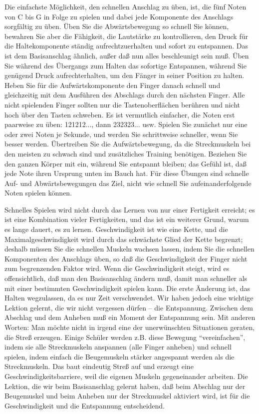 Die einfachste Möglichkeit, den schnellen Anschlag zu üben, ist, die fünf Noten von C bis G in Folge zu spielen und dabei jede Komponente des Anschlags sorgfältig zu üben.
Üben Sie die Abwärtsbewegung so schnell Sie können, bewahren Sie aber die Fähigkeit, die Lautstärke zu kontrollieren, den Druck für die Haltekomponente ständig aufrechtzuerhalten und sofort zu entspannen.
Das ist dem Basisanschlag ähnlich, außer daß nun alles beschleunigt sein muß.
Üben Sie während des Übergangs zum Halten das sofortige Entspannen, während Sie genügend Druck aufrechterhalten, um den Fänger in seiner Position zu halten.
Heben Sie für die Aufwärtskomponente den Finger danach schnell und gleichzeitig mit dem Ausführen des Abschlags durch den nächsten Finger.
Alle nicht spielenden Finger sollten nur die Tastenoberflächen berühren und nicht hoch über den Tasten schweben.
Es ist vermutlich einfacher, die Noten erst paarweise zu üben: 121212..., dann 232323... usw.
Spielen Sie zunächst nur eine oder zwei Noten je Sekunde, und werden Sie schrittweise schneller, wenn Sie besser werden.
Übertreiben Sie die Aufwärtsbewegung, da die Streckmuskeln bei den meisten zu schwach sind und zusätzliches Training benötigen.
Beziehen Sie den ganzen Körper mit ein, während Sie entspannt bleiben; das Gefühl ist, daß jede Note ihren Ursprung unten im Bauch hat.
Für diese Übungen sind schnelle Auf- und Abwärtsbewegungen das Ziel, nicht wie schnell Sie aufeinanderfolgende Noten spielen können.

Schnelles Spielen wird nicht durch das Lernen von nur einer Fertigkeit erreicht; es ist eine Kombination vieler Fertigkeiten, und das ist ein weiterer Grund, warum es lange dauert, es zu lernen.
Geschwindigkeit ist wie eine Kette, und die Maximalgeschwindigkeit wird durch das schwächste Glied der Kette begrenzt; deshalb müssen Sie die schnellen Muskeln wachsen lassen, indem Sie die schnellen Komponenten des Anschlags üben, so daß die Geschwindigkeit der Finger nicht zum begrenzenden Faktor wird.
Wenn die Geschwindigkeit steigt, wird es offensichtlich, daß man den Basisanschlag ändern muß, damit man schneller als mit einer bestimmten Geschwindigkeit spielen kann.
Die erste Änderung ist, das Halten wegzulassen, da es nur Zeit verschwendet.
Wir haben jedoch eine wichtige Lektion gelernt, die wir nicht vergessen dürfen -- die Entspannung.
Zwischen dem Abschlag und dem Anheben muß ein Moment der Entspannung sein.
Mit anderen Worten: Man möchte nicht in irgend eine der unerwünschten Situationen geraten, die Streß erzeugen.
Einige Schüler werden z.B. diese Bewegung \enquote{vereinfachen}, indem sie alle Streckmuskeln anspannen (alle Finger anheben) und schnell spielen, indem einfach die Beugemuskeln stärker angespannt werden als die Streckmuskeln.
Das baut eindeutig Streß auf und erzeugt eine Geschwindigkeitsbarriere, weil die eigenen Muskeln gegeneinander arbeiten.
Die Lektion, die wir beim Basisanschlag gelernt haben, daß beim Abschlag nur der Beugemuskel und beim Anheben nur der Streckmuskel aktiviert wird, ist für die Geschwindigkeit und die Entspannung entscheidend.


